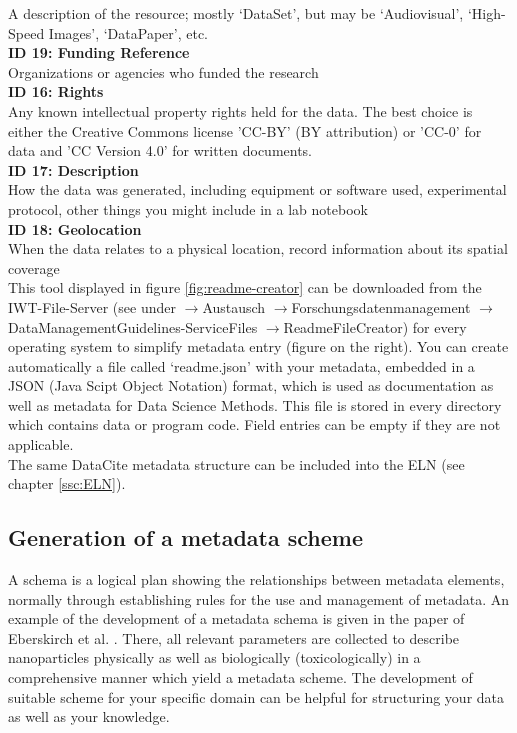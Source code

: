 A description of the resource; mostly ‘DataSet’, but may be ‘Audiovisual’, ‘High-Speed Images’, ‘DataPaper’, etc. \\[6pt]
%
\textbf{ID 19: Funding Reference} \\
Organizations or agencies who funded the research \\[6pt]
%
\textbf{ID 16: Rights} \\
Any known intellectual property rights held for the data. The best choice is either the Creative Commons license 'CC-BY' (BY attribution) or 'CC-0' for data and 'CC Version 4.0' for written documents. \\[6pt]
%
\textbf{ID 17: Description} \\
How the data was generated, including equipment or software used, experimental protocol, other things you might include in a lab notebook \\[6pt]
%
\textbf{ID 18: Geolocation} \\
When the data relates to a physical location, record information about its spatial coverage \\[6pt]
%
This tool displayed in figure \ref{fig:readme-creator} can be downloaded from the IWT-File-Server (see under $\rightarrow$Austausch $\rightarrow$Forschungs\-datenmanagement $\rightarrow$DataManagementGuidelines-ServiceFiles $\rightarrow$ReadmeFileCreator) for every operating system to simplify metadata entry (figure on the right). You can create automatically a file called ‘readme.json’ with your metadata, embedded in a JSON (Java Scipt Object Notation) format, which is used as documentation as well as metadata for Data Science Methods. This file is stored in every directory which contains data or program code. Field entries can be empty if they are not applicable. \\
%
The same DataCite metadata structure can be included into the ELN (see chapter \ref{ssc:ELN}).



\subsection{Generation of a metadata scheme}
A schema is a logical plan showing the relationships between metadata elements,
normally through establishing rules for the use and management of metadata. An example of the development of a metadata schema is given in the paper of Eberskirch et al. \cite{elberskirch:2022}. There, all relevant parameters are collected to describe nanoparticles physically as well as biologically (toxicologically) in a comprehensive manner which yield a metadata scheme.
The development of suitable scheme for your specific domain can be helpful for structuring your data as well as your knowledge.




